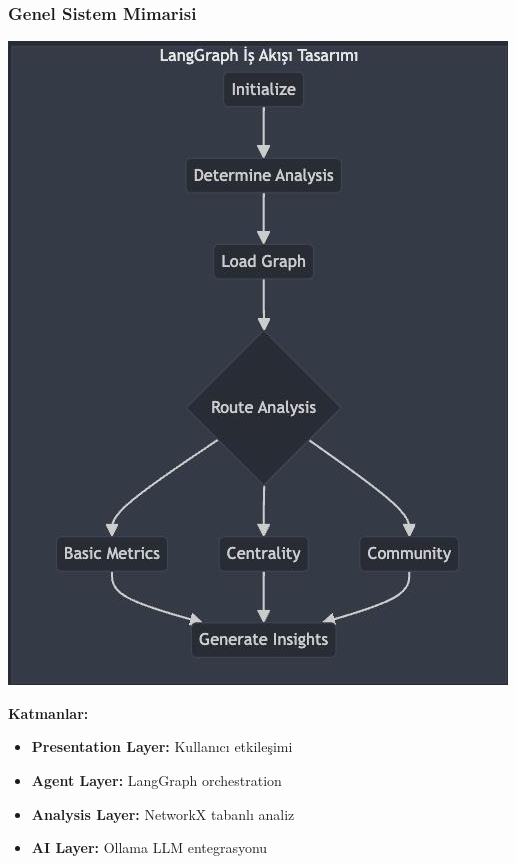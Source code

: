 \documentclass[aspectratio=169]{beamer}
\begin{document}
\begin{frame}
\frametitle{Genel Sistem Mimarisi}
\begin{center}
    \includegraphics[width=\textwidth]{architecture.png}
\end{center}

\textbf{Katmanlar:}
\begin{itemize}
    \item \textbf{Presentation Layer:} Kullanıcı etkileşimi
    \item \textbf{Agent Layer:} LangGraph orchestration
    \item \textbf{Analysis Layer:} NetworkX tabanlı analiz
    \item \textbf{AI Layer:} Ollama LLM entegrasyonu
\end{itemize}
\end{frame}
\end{document}
